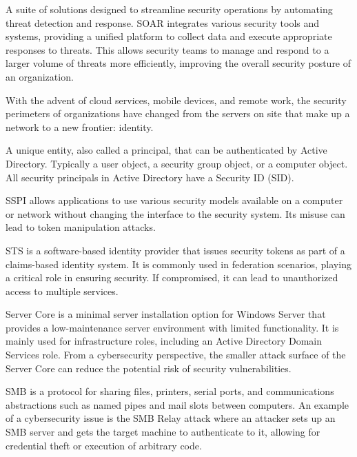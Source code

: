  A suite of solutions designed to streamline security operations by automating threat detection and response. SOAR integrates various security tools and systems, providing a unified platform to collect data and execute appropriate responses to threats. This allows security teams to manage and respond to a larger volume of threats more efficiently, improving the overall security posture of an organization.

 With the advent of cloud services, mobile devices, and remote work, the security perimeters of organizations have changed from the servers on site that make up a network to a new frontier: identity. 

 A unique entity, also called a principal, that can be authenticated by Active Directory. Typically a user object, a security group object, or a computer object. All security principals in Active Directory have a Security ID (SID).

 SSPI allows applications to use various security models available on a computer or network without changing the interface to the security system. Its misuse can lead to token manipulation attacks.

 STS is a software-based identity provider that issues security tokens as part of a claims-based identity system. It is commonly used in federation scenarios, playing a critical role in ensuring security. If compromised, it can lead to unauthorized access to multiple services.

 Server Core is a minimal server installation option for Windows Server that provides a low-maintenance server environment with limited functionality. It is mainly used for infrastructure roles, including an Active Directory Domain Services role. From a cybersecurity perspective, the smaller attack surface of the Server Core can reduce the potential risk of security vulnerabilities.

 SMB is a protocol for sharing files, printers, serial ports, and communications abstractions such as named pipes and mail slots between computers. An example of a cybersecurity issue is the SMB Relay attack where an attacker sets up an SMB server and gets the target machine to authenticate to it, allowing for credential theft or execution of arbitrary code.

